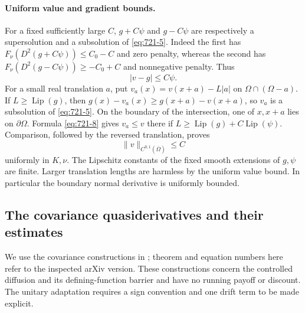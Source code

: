 \documentclass[11pt,a4paper]{article}
\theoremstyle{remark}
\begin{document}
\paragraph{Uniform value and gradient bounds.}
For a fixed sufficiently large $C$, $g+C\psi$ and $g-C\psi$ are respectively
a supersolution and a subsolution of \eqref{eq:721-5}.  Indeed the first has
$F_\nu(D^2(g+C\psi))\le C_0-C$ and zero penalty, whereas the second has
$F_\nu(D^2(g-C\psi))\ge-C_0+C$ and nonnegative penalty.  Thus
\begin{equation}
 |v-g|\le C\psi.
 \label{eq:721-8}
\end{equation}
For a small real translation $a$, put
$v_a(x)=v(x+a)-L|a|$ on $\Omega\cap(\Omega-a)$.  If
$L\ge\operatorname{Lip}(g)$, then
$g(x)-v_a(x)\ge g(x+a)-v(x+a)$, so $v_a$ is a subsolution of \eqref{eq:721-5}.
On the boundary of the intersection, one of $x,x+a$ lies on
$\partial\Omega$.  Formula \eqref{eq:721-8} gives $v_a\le v$ there if
$L\ge\operatorname{Lip}(g)+C\operatorname{Lip}(\psi)$.
Comparison, followed by the reversed translation, proves
\begin{equation}
 \|v\|_{C^{0,1}(\overline\Omega)}\le C
 \label{eq:721-9}
\end{equation}
uniformly in $K,\nu$.  The Lipschitz constants of the fixed smooth extensions
of $g,\psi$ are finite.  Larger translation lengths are harmless by the
uniform value bound.  In particular the boundary normal derivative is
uniformly bounded.

\subsection{The covariance quasiderivatives and their estimates}

We use the covariance constructions in
\cite[Lemmas 6.2--6.4 and 7.4]{ZhouBellman2015}; theorem and equation numbers
here refer to the inspected arXiv version.  These constructions concern the
controlled diffusion and its defining-function barrier and have no running
payoff or discount.  The unitary adaptation requires a sign convention and
one drift term to be made explicit.
\end{document}
